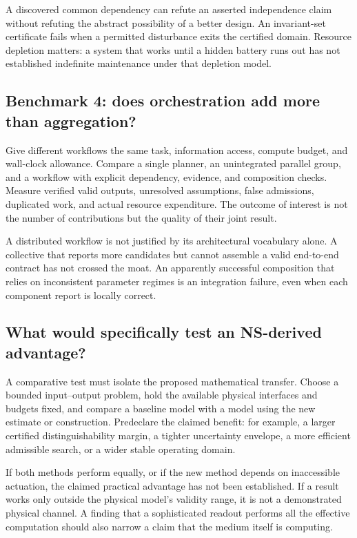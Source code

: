 \documentclass[11pt,a4paper]{article}
\theoremstyle{definition}
\theoremstyle{remark}
\begin{document}
A discovered common dependency can refute an asserted independence claim without refuting the abstract possibility of a better design. An invariant-set certificate fails when a permitted disturbance exits the certified domain. Resource depletion matters: a system that works until a hidden battery runs out has not established indefinite maintenance under that depletion model.

\subsection{Benchmark 4: does orchestration add more than aggregation?}
Give different workflows the same task, information access, compute budget, and wall-clock allowance. Compare a single planner, an unintegrated parallel group, and a workflow with explicit dependency, evidence, and composition checks. Measure verified valid outputs, unresolved assumptions, false admissions, duplicated work, and actual resource expenditure. The outcome of interest is not the number of contributions but the quality of their joint result.

A distributed workflow is not justified by its architectural vocabulary alone. A collective that reports more candidates but cannot assemble a valid end-to-end contract has not crossed the moat. An apparently successful composition that relies on inconsistent parameter regimes is an integration failure, even when each component report is locally correct.

\subsection{What would specifically test an NS-derived advantage?}
A comparative test must isolate the proposed mathematical transfer. Choose a bounded input--output problem, hold the available physical interfaces and budgets fixed, and compare a baseline model with a model using the new estimate or construction. Predeclare the claimed benefit: for example, a larger certified distinguishability margin, a tighter uncertainty envelope, a more efficient admissible search, or a wider stable operating domain.

If both methods perform equally, or if the new method depends on inaccessible actuation, the claimed practical advantage has not been established. If a result works only outside the physical model's validity range, it is not a demonstrated physical channel. A finding that a sophisticated readout performs all the effective computation should also narrow a claim that the medium itself is computing.
\end{document}

